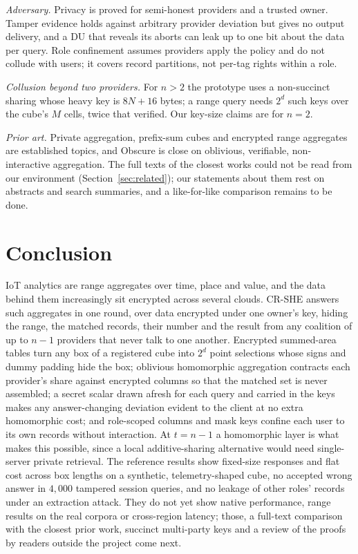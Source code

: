 \documentclass[a4paper,fleqn]{cas-sc}
\begin{document}
\emph{Adversary.} Privacy is proved for semi-honest providers and a trusted
owner. Tamper evidence holds against arbitrary provider deviation but gives no
output delivery, and a DU that reveals its aborts can leak up to one bit about
the data per query. Role confinement assumes providers apply the policy and do
not collude with users; it covers record partitions, not per-tag rights within
a role.

\emph{Collusion beyond two providers.} For $n>2$ the prototype uses a
non-succinct sharing whose heavy key is $8N+16$ bytes; a range query needs
$2^d$ such keys over the cube's $M$ cells, twice that verified. Our key-size
claims are for $n=2$.

\emph{Prior art.} Private aggregation, prefix-sum cubes and encrypted range
aggregates are established topics, and Obscure is close on oblivious,
verifiable, non-interactive aggregation. The full texts of the closest works
could not be read from our environment (Section~\ref{sec:related}); our
statements about them rest on abstracts and search summaries, and a
like-for-like comparison remains to be done.

\section{Conclusion}
\label{sec:conclusion}

IoT analytics are range aggregates over time, place and value, and the data
behind them increasingly sit encrypted across several clouds. CR-SHE answers
such aggregates in one round, over data encrypted under one owner's key,
hiding the range, the matched records, their number and the result from any
coalition of up to $n-1$ providers that never talk to one another. Encrypted
summed-area tables turn any box of a registered cube into $2^d$ point
selections whose signs and dummy padding hide the box; oblivious homomorphic
aggregation contracts each provider's share against encrypted columns so that
the matched set is never assembled; a secret scalar drawn afresh for each query
and carried in the keys makes any answer-changing deviation evident to the
client at no extra homomorphic cost; and role-scoped columns and mask keys
confine each user to its own records without interaction. At $t=n-1$ a
homomorphic layer is what makes this possible, since a local additive-sharing
alternative would need single-server private retrieval. The reference results
show fixed-size responses and flat cost across box lengths on a synthetic,
telemetry-shaped cube, no accepted wrong answer in $4{,}000$ tampered session
queries, and no leakage of other roles' records under an extraction attack.
They do not yet show native performance, range results on the real corpora or
cross-region latency; those, a full-text comparison with the closest prior
work, succinct multi-party keys and a review of the proofs by readers outside
the project come next.
\end{document}
